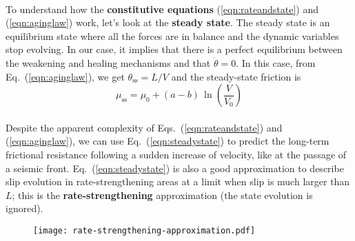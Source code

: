 \documentclass[letterpaper,12pt,]{memoir}
\begin{document}
%
%
\\
To understand how the \textbf{constitutive equations} (\ref{eqn:rateandstate}) and (\ref{eqn:aginglaw}) work, let's look at the \textbf{steady state}. The steady state is an equilibrium state where all the forces are in balance and the dynamic variables stop evolving. In our case, it implies that there is a perfect equilibrium between the weakening and healing mechanisms and that $\dot{\theta}=0$. In this case, from Eq.~(\ref{eqn:aginglaw}), we get $\theta_\text{ss}=L/V$ and the steady-state friction is\\
%
\begin{equation}\label{eqn:steadystate}
\mu_\text{ss}=\mu_0+(a-b)\,\ln\left(\frac{V}{V_0}\right)
\end{equation}
%
\\
Despite the apparent complexity of Eqs.~(\ref{eqn:rateandstate}) and (\ref{eqn:aginglaw}), we can use Eq.~(\ref{eqn:steadystate}) to predict the long-term frictional resistance following a sudden increase of velocity, like at the passage of a seismic front. Eq.~(\ref{eqn:steadystate}) is also a good approximation to describe slip evolution in rate-strengthening areas at a limit when slip is much larger than $L$; this is the \textbf{rate-strengthening} approximation (the state evolution is ignored).\\
%
\begin{figure}[h]
\begin{center}
\texttt{[image: rate-strengthening-approximation.pdf]}
\end{center}
\vspace{-0.5cm}
\end{figure}
%
\\
\end{document}
